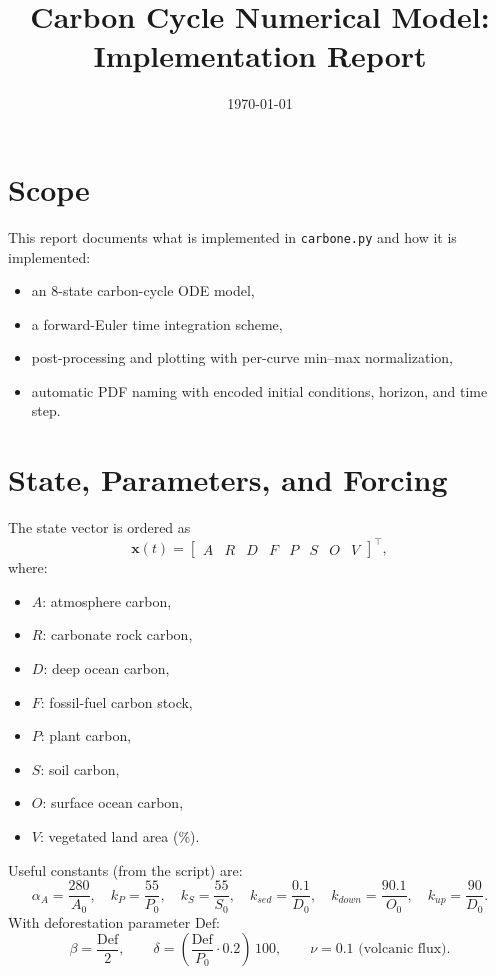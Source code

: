 \documentclass[11pt,a4paper]{article}
\title{Carbon Cycle Numerical Model: Implementation Report}
\author{}
\date{\today}
\begin{document}
\maketitle

\section{Scope}
This report documents what is implemented in \texttt{carbone.py} and how it is implemented:
\begin{itemize}
    \item an 8-state carbon-cycle ODE model,
    \item a forward-Euler time integration scheme,
    \item post-processing and plotting with per-curve min--max normalization,
    \item automatic PDF naming with encoded initial conditions, horizon, and time step.
\end{itemize}

\section{State, Parameters, and Forcing}
The state vector is ordered as
\[
\bm{x}(t)=
\begin{bmatrix}
A & R & D & F & P & S & O & V
\end{bmatrix}^{\!\top},
\]
where:
\begin{itemize}
    \item $A$: atmosphere carbon,
    \item $R$: carbonate rock carbon,
    \item $D$: deep ocean carbon,
    \item $F$: fossil-fuel carbon stock,
    \item $P$: plant carbon,
    \item $S$: soil carbon,
    \item $O$: surface ocean carbon,
    \item $V$: vegetated land area (\%).
\end{itemize}

Useful constants (from the script) are:
\[
\alpha_A=\frac{280}{A_0},\quad
k_P=\frac{55}{P_0},\quad
k_S=\frac{55}{S_0},\quad
k_{sed}=\frac{0.1}{D_0},\quad
k_{down}=\frac{90.1}{O_0},\quad
k_{up}=\frac{90}{D_0}.
\]
With deforestation parameter $\mathrm{Def}$:
\[
\beta=\frac{\mathrm{Def}}{2},
\qquad
\delta=\left(\frac{\mathrm{Def}}{P_0}\cdot 0.2\right)\,100,
\qquad
\nu=0.1 \text{ (volcanic flux)}.
\]
\end{document}
